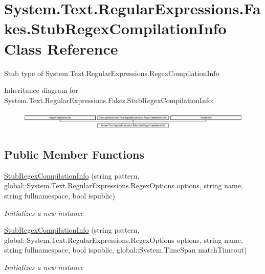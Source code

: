 \hypertarget{class_system_1_1_text_1_1_regular_expressions_1_1_fakes_1_1_stub_regex_compilation_info}{\section{System.\-Text.\-Regular\-Expressions.\-Fakes.\-Stub\-Regex\-Compilation\-Info Class Reference}
\label{class_system_1_1_text_1_1_regular_expressions_1_1_fakes_1_1_stub_regex_compilation_info}
}


Stub type of System.\-Text.\-Regular\-Expressions.\-Regex\-Compilation\-Info 


Inheritance diagram for System.\-Text.\-Regular\-Expressions.\-Fakes.\-Stub\-Regex\-Compilation\-Info\-:\begin{figure}[H]
\begin{center}
\leavevmode
\includegraphics[height=0.893142cm]{class_system_1_1_text_1_1_regular_expressions_1_1_fakes_1_1_stub_regex_compilation_info}
\end{center}
\end{figure}
\subsection*{Public Member Functions}
\begin{DoxyCompactItemize}
\item 
\hyperlink{class_system_1_1_text_1_1_regular_expressions_1_1_fakes_1_1_stub_regex_compilation_info_af971a9f3f3c3efaaf3faac3144bb07f2}{Stub\-Regex\-Compilation\-Info} (string pattern, global\-::\-System.\-Text.\-Regular\-Expressions.\-Regex\-Options options, string name, string fullnamespace, bool ispublic)
\begin{DoxyCompactList}\small\item\em Initializes a new instance\end{DoxyCompactList}\item 
\hyperlink{class_system_1_1_text_1_1_regular_expressions_1_1_fakes_1_1_stub_regex_compilation_info_a05bec6dce3a5e018412117c6cf7820b3}{Stub\-Regex\-Compilation\-Info} (string pattern, global\-::\-System.\-Text.\-Regular\-Expressions.\-Regex\-Options options, string name, string fullnamespace, bool ispublic, global\-::\-System.\-Time\-Span match\-Timeout)
\begin{DoxyCompactList}\small\item\em Initializes a new instance\end{DoxyCompactList}\end{DoxyCompactItemize}
